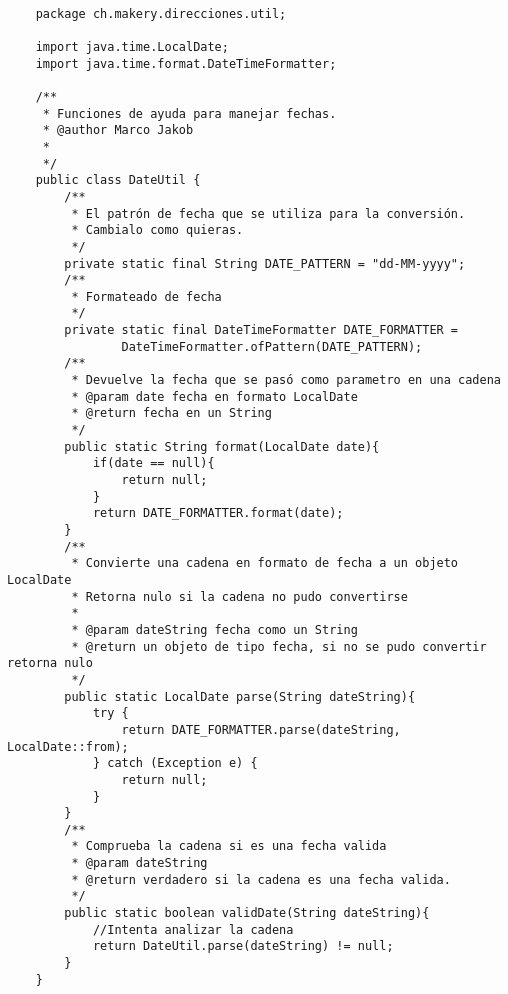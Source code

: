 \begin{verbatim}

    package ch.makery.direcciones.util;

    import java.time.LocalDate;
    import java.time.format.DateTimeFormatter;
    
    /**
     * Funciones de ayuda para manejar fechas.
     * @author Marco Jakob
     *
     */
    public class DateUtil {
        /**
         * El patrón de fecha que se utiliza para la conversión.
         * Cambialo como quieras.
         */
        private static final String DATE_PATTERN = "dd-MM-yyyy";
        /**
         * Formateado de fecha
         */
        private static final DateTimeFormatter DATE_FORMATTER =
                DateTimeFormatter.ofPattern(DATE_PATTERN);
        /**
         * Devuelve la fecha que se pasó como parametro en una cadena
         * @param date fecha en formato LocalDate
         * @return fecha en un String
         */
        public static String format(LocalDate date){
            if(date == null){
                return null;
            }
            return DATE_FORMATTER.format(date);
        }
        /**
         * Convierte una cadena en formato de fecha a un objeto LocalDate
         * Retorna nulo si la cadena no pudo convertirse
         *
         * @param dateString fecha como un String
         * @return un objeto de tipo fecha, si no se pudo convertir retorna nulo
         */
        public static LocalDate parse(String dateString){
            try {
                return DATE_FORMATTER.parse(dateString, LocalDate::from);
            } catch (Exception e) {
                return null;
            }
        }
        /**
         * Comprueba la cadena si es una fecha valida
         * @param dateString
         * @return verdadero si la cadena es una fecha valida.
         */
        public static boolean validDate(String dateString){
            //Intenta analizar la cadena
            return DateUtil.parse(dateString) != null;
        }
    }

\end{verbatim}
